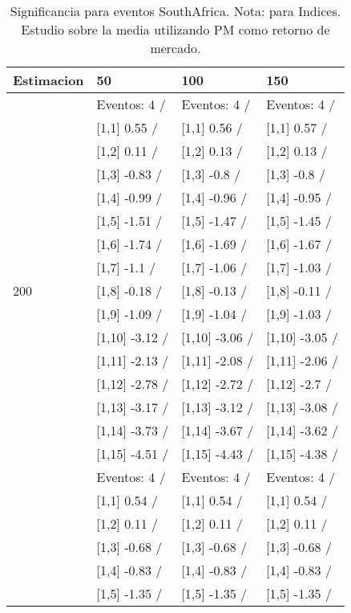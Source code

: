 \begin{table}

\caption{Significancia para eventos SouthAfrica. Nota: para Indices. Estudio sobre la media utilizando PM como retorno de mercado.}
\centering
\begin{tabular}[t]{llll}
\toprule
Estimacion & 50 & 100 & 150\\
\midrule
 & Eventos:  4 / & Eventos:  4 / & Eventos:  4 /\\
 & {}[1,1] 0.55  / & {}[1,1] 0.56  / & {}[1,1] 0.57  /\\
 & {}[1,2] 0.11  / & {}[1,2] 0.13  / & {}[1,2] 0.13  /\\
 & {}[1,3] -0.83  / & {}[1,3] -0.8  / & {}[1,3] -0.8  /\\
 & {}[1,4] -0.99  / & {}[1,4] -0.96  / & {}[1,4] -0.95  /\\
\addlinespace
 & {}[1,5] -1.51  / & {}[1,5] -1.47  / & {}[1,5] -1.45  /\\
 & {}[1,6] -1.74  / & {}[1,6] -1.69  / & {}[1,6] -1.67  /\\
 & {}[1,7] -1.1  / & {}[1,7] -1.06  / & {}[1,7] -1.03  /\\
200 & {}[1,8] -0.18  / & {}[1,8] -0.13  / & {}[1,8] -0.11  /\\
 & {}[1,9] -1.09  / & {}[1,9] -1.04  / & {}[1,9] -1.03  /\\
\addlinespace
 & {}[1,10] -3.12  / & {}[1,10] -3.06  / & {}[1,10] -3.05  /\\
 & {}[1,11] -2.13  / & {}[1,11] -2.08  / & {}[1,11] -2.06  /\\
 & {}[1,12] -2.78  / & {}[1,12] -2.72  / & {}[1,12] -2.7  /\\
 & {}[1,13] -3.17  / & {}[1,13] -3.12  / & {}[1,13] -3.08  /\\
 & {}[1,14] -3.73  / & {}[1,14] -3.67  / & {}[1,14] -3.62  /\\
\addlinespace
 & {}[1,15] -4.51  / & {}[1,15] -4.43  / & {}[1,15] -4.38  /\\
 & Eventos:  4 / & Eventos:  4 / & Eventos:  4 /\\
 & {}[1,1] 0.54  / & {}[1,1] 0.54  / & {}[1,1] 0.54  /\\
 & {}[1,2] 0.11  / & {}[1,2] 0.11  / & {}[1,2] 0.11  /\\
 & {}[1,3] -0.68  / & {}[1,3] -0.68  / & {}[1,3] -0.68  /\\
\addlinespace
 & {}[1,4] -0.83  / & {}[1,4] -0.83  / & {}[1,4] -0.83  /\\
 & {}[1,5] -1.35  / & {}[1,5] -1.35  / & {}[1,5] -1.35  /\\

\end{tabular}
\end{table}

